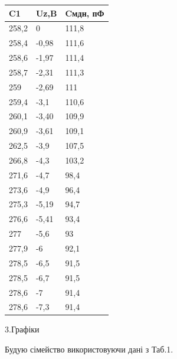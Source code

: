 \documentclass[a4paper,14pt]{extreport}
\begin{document}
\begin{minipage}{0.9\textwidth}
\begin{minipage}{0.4\textwidth}
\begin{tabular}{|l|l|l|}
			\hline
			C1    & Uz,B   & Cмдн, пФ \\ \hline
			258,2 & 0      & 111,8    \\ \hline
			258,4 & -0,98 & 111,6    \\ \hline
			258,6 & -1,97 & 111,4    \\ \hline
			258,7 & -2,31 & 111,3    \\ \hline
			259   & -2,69 & 111      \\ \hline
			259,4 & -3,1 & 110,6    \\ \hline
			260,1 & -3,40 & 109,9    \\ \hline
			260,9 & -3,61 & 109,1    \\ \hline
			262,5 & -3,9 & 107,5    \\ \hline
			266,8 & -4,3 & 103,2    \\ \hline
			271,6 & -4,7 & 98,4     \\ \hline
			273,6 & -4,9   & 96,4     \\ \hline
			275,3 & -5,19  & 94,7     \\ \hline
			276,6 & -5,41  & 93,4     \\ \hline
			277   & -5,6   & 93       \\ \hline
			277,9 & -6     & 92,1     \\ \hline
			278,5 & -6,5   & 91,5     \\ \hline
			278,5 & -6,7   & 91,5     \\ \hline
			278,6 & -7     & 91,4     \\ \hline
			278,6 & -7,3   & 91,4     \\ \hline
			\end{tabular}
		\end{minipage}
\end{minipage}



\newpage
\begin{center}3.Графіки\\ \end{center}
	Будую сімейство використовуючи дані з Таб.1.
	\begin{center}
\end{center}
\end{document}
